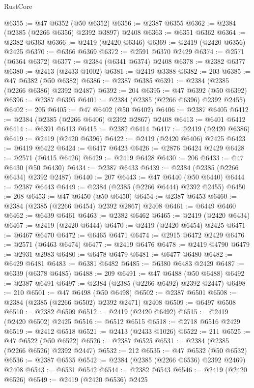 \begin{lexlean}{RustCore}
\begin{coremodule}
@6355 := @47 @6352 (@50 @6352)
@6356 := @2387 @6355
@6362 := @2384 (@2385 (@2266 @6356) @2392 @3897) @2408
@6363 := @6351 @6362
@6364 := @2382 @6363
@6366 := @2419 (@2420 @6346)
@6369 := @2419 (@2420 @6356) @2425
@6370 := @6366 @6369
@6372 := @2591 @6370 @2429
@6374 := @2571 (@6364 @6372)
@6377 := @2384 (@6341 @6374) @2408
@6378 := @2382 @6377
@6380 := @2413 (@2433 @1002)
@6381 := @2419 @3388
@6382 := 203
@6385 := @47 @6382 (@50 @6382)
@6386 := @2387 @6385
@6391 := @2384 (@2385 (@2266 @6386) @2392 @2487)
@6392 := 204
@6395 := @47 @6392 (@50 @6392)
@6396 := @2387 @6395
@6401 := @2384 (@2385 (@2266 @6396) @2392 @2455)
@6402 := 205
@6405 := @47 @6402 (@50 @6402)
@6406 := @2387 @6405
@6412 := @2384 (@2385 (@2266 @6406) @2392 @2867) @2408
@6413 := @6401 @6412
@6414 := @6391 @6413
@6415 := @2382 @6414
@6417 := @2419 (@2420 @6386)
@6419 := @2419 (@2420 @6396)
@6422 := @2419 (@2420 @6406) @2425
@6423 := @6419 @6422
@6424 := @6417 @6423
@6426 := @2876 @6424 @2429
@6428 := @2571 (@6415 @6426)
@6429 := @2419 @6428
@6430 := 206
@6433 := @47 @6430 (@50 @6430)
@6434 := @2387 @6433
@6439 := @2384 (@2385 (@2266 @6434) @2392 @2487)
@6440 := 207
@6443 := @47 @6440 (@50 @6440)
@6444 := @2387 @6443
@6449 := @2384 (@2385 (@2266 @6444) @2392 @2455)
@6450 := 208
@6453 := @47 @6450 (@50 @6450)
@6454 := @2387 @6453
@6460 := @2384 (@2385 (@2266 @6454) @2392 @2867) @2408
@6461 := @6449 @6460
@6462 := @6439 @6461
@6463 := @2382 @6462
@6465 := @2419 (@2420 @6434)
@6467 := @2419 (@2420 @6444)
@6470 := @2419 (@2420 @6454) @2425
@6471 := @6467 @6470
@6472 := @6465 @6471
@6474 := @2915 @6472 @2429
@6476 := @2571 (@6463 @6474)
@6477 := @2419 @6476
@6478 := @2419 @4790
@6479 := @2931 @2983
@6480 := @6478 @6479
@6481 := @6477 @6480
@6482 := @6429 @6481
@6483 := @6381 @6482
@6485 := @6380 @6483 @2429
@6487 := @6339 (@6378 @6485)
@6488 := 209
@6491 := @47 @6488 (@50 @6488)
@6492 := @2387 @6491
@6497 := @2384 (@2385 (@2266 @6492) @2392 @2447)
@6498 := 210
@6501 := @47 @6498 (@50 @6498)
@6502 := @2387 @6501
@6508 := @2384 (@2385 (@2266 @6502) @2392 @2471) @2408
@6509 := @6497 @6508
@6510 := @2382 @6509
@6512 := @2419 (@2420 @6492)
@6515 := @2419 (@2420 @6502) @2425
@6516 := @6512 @6515
@6518 := @2718 @6516 @2429
@6519 := @2412 @6518
@6521 := @2413 (@2433 @1026)
@6522 := 211
@6525 := @47 @6522 (@50 @6522)
@6526 := @2387 @6525
@6531 := @2384 (@2385 (@2266 @6526) @2392 @2447)
@6532 := 212
@6535 := @47 @6532 (@50 @6532)
@6536 := @2387 @6535
@6542 := @2384 (@2385 (@2266 @6536) @2392 @2469) @2408
@6543 := @6531 @6542
@6544 := @2382 @6543
@6546 := @2419 (@2420 @6526)
@6549 := @2419 (@2420 @6536) @2425

\end{coremodule}
\end{lexlean}
